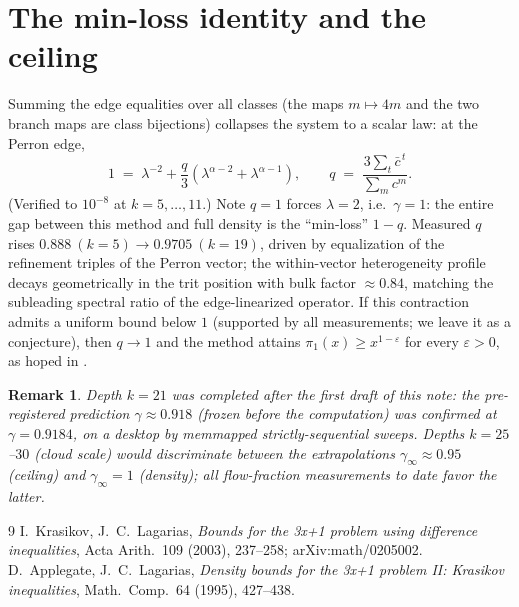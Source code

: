 \documentclass[11pt]{article}
\newtheorem{remark}{Remark}
\begin{document}
\section{The min-loss identity and the ceiling}
Summing the edge equalities over all classes (the maps $m\mapsto 4m$ and the two branch maps
are class bijections) collapses the system to a scalar law: at the Perron edge,
\[
1\;=\;\lambda^{-2}+\frac{q}{3}\left(\lambda^{\alpha-2}+\lambda^{\alpha-1}\right),
\qquad q \;=\; \frac{3\sum_t \bar c^{\,t}}{\sum_m c^m}.
\]
(Verified to $10^{-8}$ at $k=5,\dots,11$.) Note $q=1$ forces $\lambda=2$, i.e.\ $\gamma=1$:
the entire gap between this method and full density is the ``min-loss'' $1-q$. Measured
$q$ rises $0.888\ (k{=}5)\to 0.9705\ (k{=}19)$, driven by equalization of the refinement
triples of the Perron vector; the within-vector heterogeneity profile decays geometrically
in the trit position with bulk factor $\approx 0.84$, matching the subleading spectral ratio
of the edge-linearized operator. If this contraction admits a uniform bound below $1$
(supported by all measurements; we leave it as a conjecture), then $q\to 1$ and the method
attains $\pi_1(x)\ge x^{1-\varepsilon}$ for every $\varepsilon>0$, as hoped in \cite{KL}.

\begin{remark}
Depth $k=21$ was completed after the first draft of this note: the pre-registered
prediction $\gamma\approx0.918$ (frozen before the computation) was confirmed at
$\gamma=0.9184$, on a desktop by memmapped strictly-sequential sweeps. Depths
$k=25$--$30$ (cloud scale) would discriminate between the extrapolations
$\gamma_\infty\approx0.95$ (ceiling) and $\gamma_\infty=1$ (density); all
flow-fraction measurements to date favor the latter.
\end{remark}

\begin{thebibliography}{9}
 I.~Krasikov, J.~C.~Lagarias, \emph{Bounds for the 3x+1 problem using difference
inequalities}, Acta Arith.\ 109 (2003), 237--258; arXiv:math/0205002.
 D.~Applegate, J.~C.~Lagarias, \emph{Density bounds for the 3x+1 problem II:
Krasikov inequalities}, Math.\ Comp.\ 64 (1995), 427--438.
\end{thebibliography}
\end{document}
